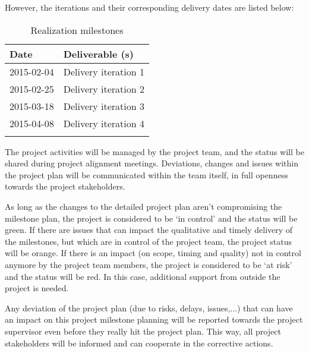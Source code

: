 However, the iterations and their corresponding delivery dates  are listed below:
%
\begin{longtable}{|l|l|}\hline
    \textbf{Date} & \textbf{Deliverable (s)} \\\hline
	\endhead
    2015-02-04 & Delivery iteration 1\\\hline
    2015-02-25 & Delivery iteration 2\\\hline
    2015-03-18 & Delivery iteration 3\\\hline
    2015-04-08 & Delivery iteration 4\\\hline
  \caption{Realization milestones}
  \label{tab:realization-milestones}
\end{longtable}

\noindent
The project activities will be managed by the project team, and the status will be shared during project alignment meetings.
Deviations, changes and issues within the project plan will be communicated within the team itself, in full openness towards the project stakeholders.

As long as the changes to the detailed project plan aren't  compromising the milestone plan, the project is considered to be `in control' and the status will be green.
If there are issues that can impact the qualitative and timely delivery of the milestones, but which are in control of the project team, the project status will be orange.
If there is an impact (on scope, timing and quality) not in control anymore by the project team members, the project is considered to be `at risk' and the status will be red.
In this case, additional support from outside the project is needed.

Any deviation of the project plan (due to risks, delays, issues,...) that can have an impact on this project milestone planning will be reported towards the project supervisor even before they really hit the project plan.
This way, all project stakeholders will be informed and can cooperate in the corrective actions.
